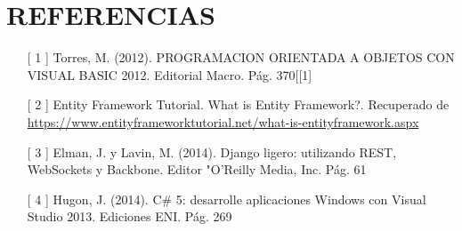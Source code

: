 \section{REFERENCIAS} 



\begin{itemize}
	\item [[ 1]]  Torres, M. (2012). PROGRAMACION ORIENTADA A OBJETOS CON VISUAL BASIC 2012. Editorial Macro. Pág. 370[[1]
	\item  [[ 2]] Entity Framework Tutorial. What is Entity Framework?. Recuperado de \url{ https://www.entityframeworktutorial.net/what-is-entityframework.aspx}
 	\item   [[ 3]] Elman, J. y Lavin, M. (2014). Django ligero: utilizando REST, WebSockets y Backbone. Editor "O'Reilly Media, Inc. Pág. 61
	\item  [[ 4]]  Hugon, J. (2014). C\# 5: desarrolle aplicaciones Windows con Visual Studio 2013. Ediciones ENI. Pág. 269
\end{itemize}
